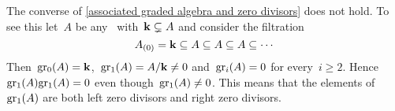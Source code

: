 \begin{remark}
  The converse of \cref{associated graded algebra and zero divisors} does not hold.
  To see this let~$A$ be any~\algebra{$\kf$} with~$\mathbf{k} \subsetneq A$ and consider the filtration
  \[
    A_{(0)}
    =
    \mathbf{k}
    \subseteq
    A
    \subseteq
    A
    \subseteq
    A
    \subseteq
    \dotsb
  \]
  Then~$\gr[0](A) = \kf$,~$\gr[1](A) = A/{\kf} \neq 0$ and~$\gr[i](A) = 0$ for every~$i \geq 2$.
  Hence~$\gr[1](A) \gr[1](A) = 0$ even though~$\gr[1](A) \neq 0$.
  This means that the elements of~$\gr[1](A)$ are both left zero divisors and right zero divisors.
\end{remark}




